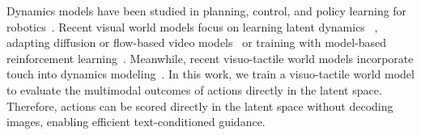 Dynamics models have been studied in planning, control, and policy learning for robotics~\cite{sutton1991dyna,deisenroth2011pilco,chua2018deep}. Recent visual world models focus on learning latent dynamics ~\cite{zhou2025dino,huang2026vjepa,assran2025v}, adapting diffusion or flow-based video models~\cite{guo2025ctrl,alhaija2025cosmos,gao2026dreamdojo} or training with model-based reinforcement learning~\cite{hafner2019dream,hafner2023mastering,wu2023daydreamer, hafner2025training}. Meanwhile, recent visuo-tactile world models incorporate touch into dynamics modeling~\cite{higuera2026visuo,tian2019manipulation,zheng2026omnivta,yuan2026vtam}.
In this work, we train a visuo-tactile world model to evaluate the multimodal outcomes of actions directly in the latent space. 
Therefore, actions can be scored directly in the latent space without decoding images, enabling efficient text-conditioned 
guidance.
















